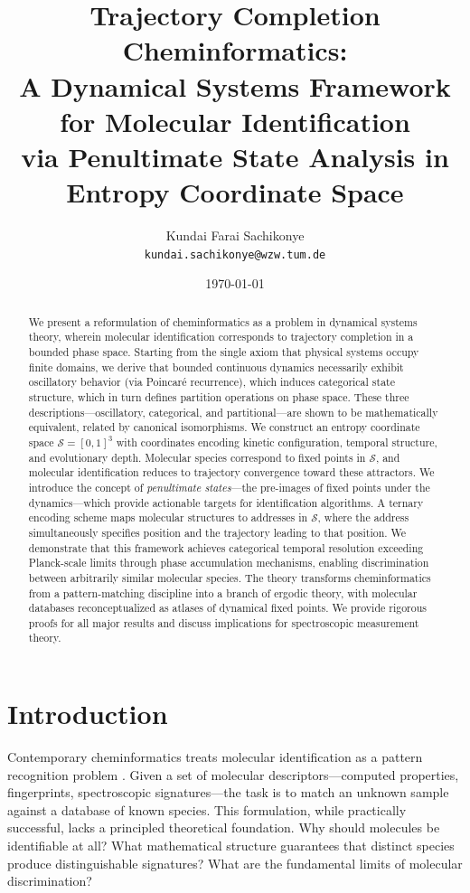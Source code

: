 \documentclass[twocolumn,10pt,a4paper]{article}
\title{Trajectory Completion Cheminformatics: \\
A Dynamical Systems Framework for Molecular Identification \\
via Penultimate State Analysis in Entropy Coordinate Space}
\author{
    Kundai Farai Sachikonye\\
    \texttt{kundai.sachikonye@wzw.tum.de}
}
\date{\today}
\newcommand{\Sspace}{\mathcal{S}}
\begin{document}
\maketitle

\begin{abstract}
We present a reformulation of cheminformatics as a problem in dynamical systems theory, wherein molecular identification corresponds to trajectory completion in a bounded phase space. Starting from the single axiom that physical systems occupy finite domains, we derive that bounded continuous dynamics necessarily exhibit oscillatory behavior (via Poincar\'{e} recurrence), which induces categorical state structure, which in turn defines partition operations on phase space. These three descriptions---oscillatory, categorical, and partitional---are shown to be mathematically equivalent, related by canonical isomorphisms. We construct an entropy coordinate space $\Sspace = [0,1]^3$ with coordinates encoding kinetic configuration, temporal structure, and evolutionary depth. Molecular species correspond to fixed points in $\Sspace$, and molecular identification reduces to trajectory convergence toward these attractors. We introduce the concept of \emph{penultimate states}---the pre-images of fixed points under the dynamics---which provide actionable targets for identification algorithms. A ternary encoding scheme maps molecular structures to addresses in $\Sspace$, where the address simultaneously specifies position and the trajectory leading to that position. We demonstrate that this framework achieves categorical temporal resolution exceeding Planck-scale limits through phase accumulation mechanisms, enabling discrimination between arbitrarily similar molecular species. The theory transforms cheminformatics from a pattern-matching discipline into a branch of ergodic theory, with molecular databases reconceptualized as atlases of dynamical fixed points. We provide rigorous proofs for all major results and discuss implications for spectroscopic measurement theory.
\end{abstract}

\section{Introduction}

Contemporary cheminformatics treats molecular identification as a pattern recognition problem \citep{todeschini2009molecular}. Given a set of molecular descriptors---computed properties, fingerprints, spectroscopic signatures---the task is to match an unknown sample against a database of known species. This formulation, while practically successful, lacks a principled theoretical foundation. Why should molecules be identifiable at all? What mathematical structure guarantees that distinct species produce distinguishable signatures? What are the fundamental limits of molecular discrimination?
\end{document}
